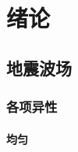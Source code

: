 \documentclass[11pt,a4paper,openany]{book}
\begin{document}
\chapter{绪论}
\section{地震波场}
\subsection{各项异性}
\subsubsection{均匀}
\end{document}
